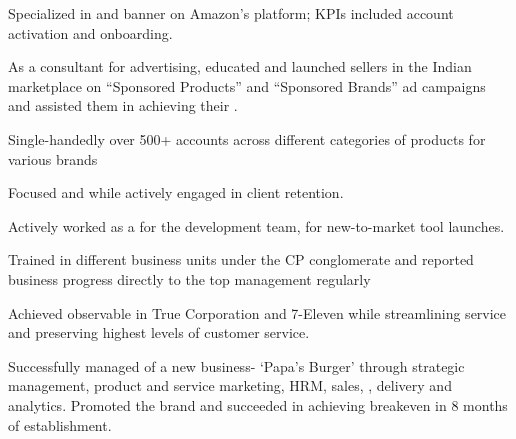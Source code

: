 \documentclass[]{aj-resume-openfont}
\begin{document}
\begin{minipage}[t]{0.66\textwidth}
\begin{tightemize}
\item Specialized in  and banner  on Amazon’s platform; KPIs included account activation and onboarding.
\item As a consultant for advertising, educated and launched sellers in the Indian marketplace on “Sponsored Products” and “Sponsored Brands” ad campaigns and assisted them in achieving their .
\item Single-handedly  over 500+ accounts across different categories of products for various brands
\item Focused  and  while actively engaged in client retention.
\item Actively worked as a  for the development team, for new-to-market tool launches.
\end{tightemize}
\sectionsep

\begin{tightemize}
\item Trained in different business units under the CP conglomerate and reported business progress directly to the top management regularly
\item Achieved observable  in True Corporation and 7-Eleven while streamlining service and preserving highest levels of customer service.
\item Successfully managed  of a new business- ‘Papa’s Burger’ through strategic management, product and service marketing, HRM, sales, , delivery
and analytics. Promoted the brand and succeeded in achieving breakeven in 8 months of establishment.
\end{tightemize}
\sectionsep


\end{minipage} 
\end{document}
